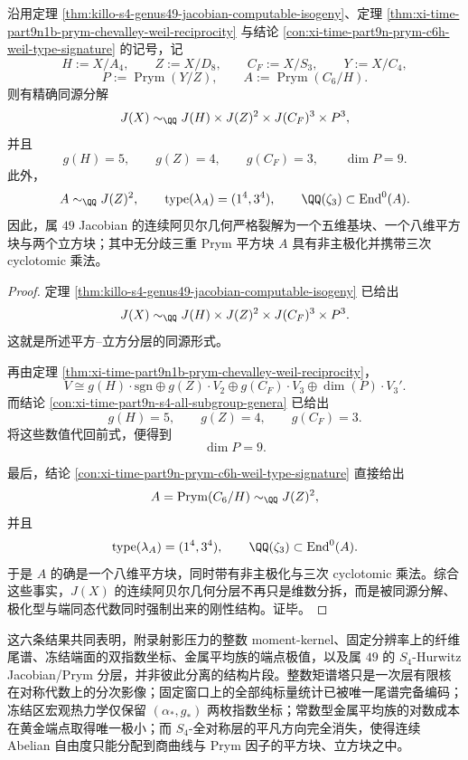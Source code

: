 \begin{theorem}\label{thm:xi-time-part9xf-genus49-jacobian-square-cube-stratification}
沿用定理 \ref{thm:killo-s4-genus49-jacobian-computable-isogeny}、定理 \ref{thm:xi-time-part9n1b-prym-chevalley-weil-reciprocity} 与结论 \ref{con:xi-time-part9n-prym-c6h-weil-type-signature} 的记号，记
\[
H:=X/A_4,\qquad
Z:=X/D_8,\qquad
C_F:=X/S_3,\qquad
Y:=X/C_4,
\]
\[
P:=\operatorname{Prym}(Y/Z),
\qquad
A:=\operatorname{Prym}(C_6/H).
\]
则有精确同源分解
\[
J(X)\sim_{\QQ}J(H)\times J(Z)^2\times J(C_F)^3\times P^3,
\]
并且
\[
g(H)=5,
\qquad
g(Z)=4,
\qquad
g(C_F)=3,
\qquad
\dim P=9.
\]
此外，
\[
A\sim_{\QQ}J(Z)^2,
\qquad
\mathrm{type}(\lambda_A)=(1^4,3^4),
\qquad
\QQ(\zeta_3)\subset \operatorname{End}^0(A).
\]
因此，属 \(49\) Jacobian 的连续阿贝尔几何严格裂解为一个五维基块、一个八维平方块与两个立方块；其中无分歧三重 Prym 平方块 \(A\) 具有非主极化并携带三次 cyclotomic 乘法。
\end{theorem}
\begin{proof}
定理 \ref{thm:killo-s4-genus49-jacobian-computable-isogeny} 已给出
\[
J(X)\sim_{\QQ}J(H)\times J(Z)^2\times J(C_F)^3\times P^3.
\]
这就是所述平方--立方分层的同源形式。

再由定理 \ref{thm:xi-time-part9n1b-prym-chevalley-weil-reciprocity}，
\[
V\cong
g(H)\cdot \mathrm{sgn}\oplus
g(Z)\cdot V_2\oplus
g(C_F)\cdot V_3\oplus
\dim(P)\cdot V_3'.
\]
而结论 \ref{con:xi-time-part9n-s4-all-subgroup-genera} 已给出
\[
g(H)=5,
\qquad
g(Z)=4,
\qquad
g(C_F)=3.
\]
将这些数值代回前式，便得到
\[
\dim P=9.
\]

最后，结论 \ref{con:xi-time-part9n-prym-c6h-weil-type-signature} 直接给出
\[
A=\operatorname{Prym}(C_6/H)\sim_{\QQ}J(Z)^2,
\]
并且
\[
\mathrm{type}(\lambda_A)=(1^4,3^4),
\qquad
\QQ(\zeta_3)\subset \operatorname{End}^0(A).
\]
于是 \(A\) 的确是一个八维平方块，同时带有非主极化与三次 cyclotomic 乘法。综合这些事实，\(J(X)\) 的连续阿贝尔几何分层不再只是维数分拆，而是被同源分解、极化型与端同态代数同时强制出来的刚性结构。证毕。
\end{proof}

\noindent
这六条结果共同表明，附录射影压力的整数 moment-kernel、固定分辨率上的纤维尾谱、冻结端面的双指数坐标、金属平均族的端点极值，以及属 \(49\) 的 \(S_4\)-Hurwitz Jacobian/Prym 分层，并非彼此分离的结构片段。整数矩谱塔只是一次层有限核在对称代数上的分次影像；固定窗口上的全部纯标量统计已被唯一尾谱完备编码；冻结区宏观热力学仅保留 \((\alpha_*,g_*)\) 两枚指数坐标；常数型金属平均族的对数成本在黄金端点取得唯一极小；而 \(S_4\)-全对称层的平凡方向完全消失，使得连续 Abelian 自由度只能分配到商曲线与 Prym 因子的平方块、立方块之中。

\endinput
